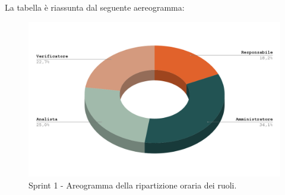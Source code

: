 \documentclass[10pt, a4paper]{article}
\begin{document}
La tabella è riassunta dal seguente aereogramma:
 \begin{figure}[H]
        \centering        
        \includegraphics[width=15.5cm]{aereogrammi/areogramma_1_periodo.png}
        \caption{Sprint 1 - Areogramma della ripartizione oraria dei ruoli. }
    \end{figure}



\end{document}

